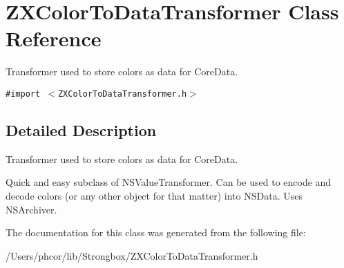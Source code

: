\hypertarget{interface_z_x_color_to_data_transformer}{
\section{ZXColorToDataTransformer Class Reference}
\label{interface_z_x_color_to_data_transformer}
}
Transformer used to store colors as data for CoreData.  


{\tt \#import $<$ZXColorToDataTransformer.h$>$}



\subsection{Detailed Description}
Transformer used to store colors as data for CoreData. 

Quick and easy subclass of NSValueTransformer. Can be used to encode and decode colors (or any other object for that matter) into NSData. Uses NSArchiver. 

The documentation for this class was generated from the following file:\begin{CompactItemize}
\item 
/Users/phcor/lib/Strongbox/ZXColorToDataTransformer.h\end{CompactItemize}
